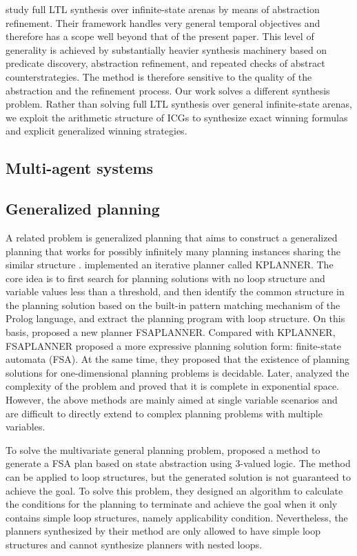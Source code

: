 \documentclass[review]{elsarticle}
\begin{document}
\citet{AzzopardiPDS2025} study full LTL synthesis over infinite-state arenas by means of abstraction refinement.
Their framework handles very general temporal objectives and therefore has a scope well beyond that of the present paper.
This level of generality is achieved by substantially heavier synthesis machinery based on predicate discovery, abstraction refinement, and repeated checks of abstract counterstrategies.
The method is therefore sensitive to the quality of the abstraction and the refinement process.
Our work solves a different synthesis problem.
Rather than solving full LTL synthesis over general infinite-state arenas, we exploit the arithmetic structure of ICGs to synthesize exact winning formulas and explicit generalized winning strategies.


\subsection{Multi-agent systems}


\subsection{Generalized planning} 
A related problem is generalized planning that aims to construct a generalized planning that works for possibly infinitely many planning instances sharing the similar structure \cite{Lev2005}.
\citet{Lev2005} implemented an iterative planner called KPLANNER. 
The core idea is to first search for planning solutions with no loop structure and variable values less than a threshold, and then identify the common structure in the planning solution based on the built-in pattern matching mechanism of the Prolog language, and extract the planning program with loop structure. 
On this basis, \citet{HuL2010} proposed a new planner FSAPLANNER. Compared with KPLANNER, FSAPLANNER proposed a more expressive planning solution form: finite-state automata (FSA). 
At the same time, they proposed that the existence of planning solutions for one-dimensional planning problems is decidable. 
Later, \citet{HuG2011} analyzed the complexity of the problem and proved that it is complete in exponential space. 
However, the above methods are mainly aimed at single variable scenarios and are difficult to directly extend to complex planning problems with multiple variables.

To solve the multivariate general planning problem, \citet{SriIZ2011} proposed a method to generate a FSA plan based on state abstraction using 3-valued logic. 
The method can be applied to loop structures, but the generated solution is not guaranteed to achieve the goal. 
To solve this problem, they designed an algorithm to calculate the conditions for the planning to terminate and achieve the goal when it only contains simple loop structures, namely applicability
condition\cite{SriIZ2012}. 
Nevertheless, the planners synthesized by their method are only allowed to have simple loop structures and cannot synthesize planners with nested loops.
\end{document}
